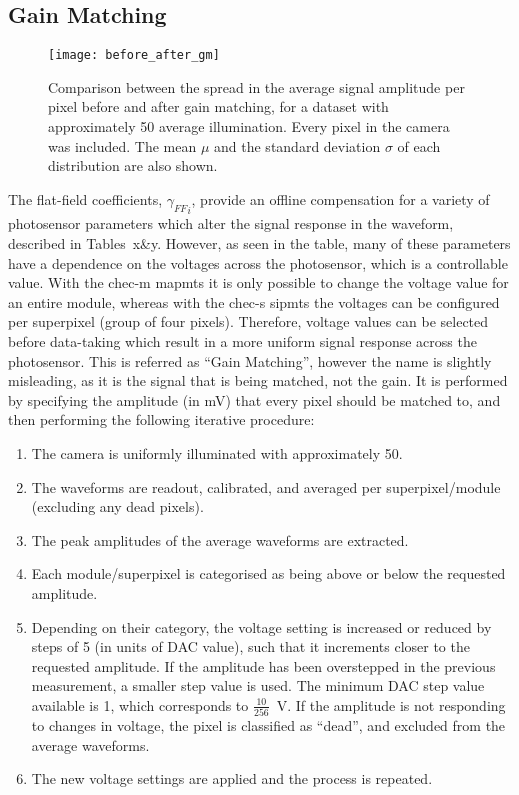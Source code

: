\subsection{Gain Matching}

\begin{figure}
	\centering
    \texttt{[image: before\_after\_gm]} 
	\caption[Gain-Matching Residuals]{Comparison between the spread in the average signal amplitude per pixel before and after gain matching, for a dataset with approximately \SI{50}{\pe} average illumination. Every pixel in the camera was included. The mean $\mu$ and the standard deviation $\sigma$ of each distribution are also shown.} 
	\label{fig:before_after_gm}
\end{figure}

The flat-field coefficients, ${\gamma_{FF}}_i$, provide an offline compensation for a variety of photosensor parameters which alter the signal response in the waveform, described in Tables~x\&y. However, as seen in the table, many of these parameters have a dependence on the voltages across the photosensor, which is a controllable value. With the \gls{chec-m} \glspl{mapmt} it is only possible to change the voltage value for an entire module, whereas with the \gls{chec-s} \glspl{sipmt} the voltages can be configured per superpixel (group of four pixels). Therefore, voltage values can be selected before data-taking which result in a more uniform signal response across the photosensor. This is referred as ``Gain Matching'', however the name is slightly misleading, as it is the signal that is being matched, not the gain. It is performed by specifying the amplitude (in \si{mV}) that every pixel should be matched to, and then performing the following iterative procedure:
\begin{enumerate}
	\item The camera is uniformly illuminated with approximately \SI{50}{\pe}.
	\item The waveforms are readout, calibrated, and averaged per superpixel/module (excluding any dead pixels).
    \item The peak amplitudes of the average waveforms are extracted.
    \item Each module/superpixel is categorised as being above or below the requested amplitude.
    \item Depending on their category, the voltage setting is increased or reduced by steps of 5 (in units of DAC value), such that it increments closer to the requested amplitude. If the amplitude has been overstepped in the previous measurement, a smaller step value is used. The minimum DAC step value available is 1, which corresponds to $\frac{10}{256}$~V. If the amplitude is not responding to changes in voltage, the pixel is classified as ``dead'', and excluded from the average waveforms.
    \item The new voltage settings are applied and the process is repeated.
\end{enumerate}

